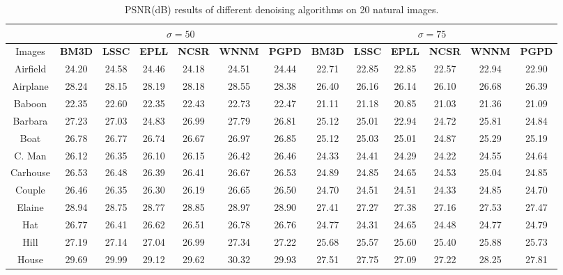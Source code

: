 \begin{table}[t!]
\begin{adjustwidth}{-0.2cm}{}
\caption{PSNR(dB) results of different denoising algorithms on 20 natural images.}
\label{tab2-4}
\begin{center}
\renewcommand\arraystretch{1.0}
\scriptsize
\begin{tabular}{|c||c|c|c|c|c|c||c|c|c|c|c|c|}
\hline
&\multicolumn{6}{c||}{ $\sigma = 50$}&\multicolumn{6}{c|}{ $\sigma = 75$}
\\
\hline
\hline
Images&\textbf{BM3D}&\textbf{LSSC}&\textbf{EPLL}&\textbf{NCSR}&\textbf{WNNM}&\textbf{PGPD}
&\textbf{BM3D}&\textbf{LSSC}&\textbf{EPLL}&\textbf{NCSR}&\textbf{WNNM}&\textbf{PGPD} 
\\
\hline
 Airfield & 24.20 & 24.58 & 24.46  &24.18 & 24.51 & 24.44    & 22.71 & 22.85 & 22.85 & 22.57 &22.94 &22.90 
\\
\hline
 Airplane & 28.24 & 28.15 & 28.19 & 28.18 &  28.55 & 28.38     & 26.40 & 26.16 & 26.14  & 26.10 &  26.68 & 26.39
\\
\hline
 Baboon & 22.35  & 22.60 & 22.35 & 22.43  & 22.73 &22.47     &  21.11&  21.18  & 20.85  & 21.03  & 21.36 & 21.09
\\
\hline
 Barbara & 27.23  & 27.03  & 24.83  & 26.99 &  27.79 & 26.81    & 25.12  & 25.01  & 22.94   &  24.72& 25.81 &24.84
\\
\hline
  Boat& 26.78 & 26.77  & 26.74  & 26.67 & 26.97 &  26.85   & 25.12 & 25.03 & 25.01 &  24.87&  25.29 &25.19         
\\
\hline
 C. Man   & 26.12 & 26.35   & 26.10 & 26.15 & 26.42 & 26.46   & 24.33 & 24.41 &  24.29  & 24.22 &  24.55 &24.64     
\\
\hline
 Carhouse  & 26.53 & 26.48  &  26.39   & 26.41 & 26.67 &26.53   &  24.89 & 24.85  &  24.65  & 24.53  &25.04 &24.85
\\
\hline
 Couple & 26.46 & 26.35  & 26.30 & 26.19 &  26.65 & 26.50   & 24.70 & 24.51 & 24.51 & 24.33 & 24.85 &24.70   
\\
\hline
 Elaine &  28.94 & 28.75 & 28.77   & 28.85 & 28.97 &28.90    &   27.41  & 27.27 & 27.38  &  27.16 &27.53 &27.47   
\\
\hline
 Hat  &  26.77 & 26.41 & 26.62  & 26.51 & 26.78 &26.76      &   24.77  & 24.31  & 24.65   &  24.48 &24.77 & 24.79
\\
\hline
 Hill  & 27.19 & 27.14  & 27.04 & 26.99   &27.34 &27.22     & 25.68 & 25.57 & 25.60 &  25.40 & 25.88  & 25.73
\\
\hline
 House  & 29.69 & 29.99  & 29.12  & 29.62  & 30.32 &29.93     & 27.51 & 27.75  &  27.09 &  27.22 & 28.25 & 27.81    

\end{tabular}
\end{center}
\end{adjustwidth}
\end{table}
